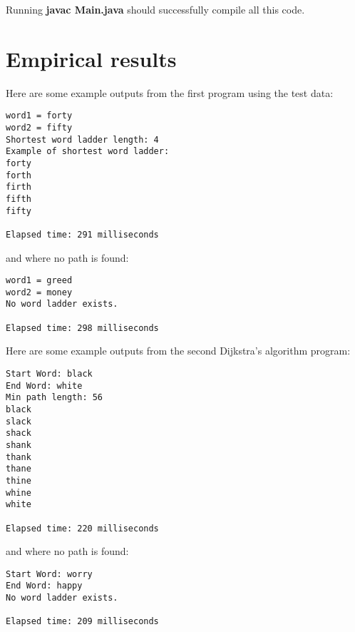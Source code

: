 \documentclass[11pt]{article}
\begin{document}
\begin{itemize}
Running \textbf{javac Main.java} should successfully compile all this code.
\end{itemize}

\section*{Empirical results}

Here are some example outputs from the first program using the test data:

\begin{verbatim}
word1 = forty
word2 = fifty
Shortest word ladder length: 4
Example of shortest word ladder:
forty
forth
firth
fifth
fifty

Elapsed time: 291 milliseconds
\end{verbatim}
and where no path is found:
\begin{verbatim}
word1 = greed
word2 = money
No word ladder exists.

Elapsed time: 298 milliseconds
\end{verbatim}
Here are some example outputs from the second Dijkstra's algorithm program:

\begin{verbatim}
Start Word: black
End Word: white
Min path length: 56
black
slack
shack
shank
thank
thane
thine
whine
white

Elapsed time: 220 milliseconds
\end{verbatim}
and where no path is found:
\begin{verbatim}
Start Word: worry
End Word: happy
No word ladder exists.

Elapsed time: 209 milliseconds
\end{verbatim}
\end{document}
